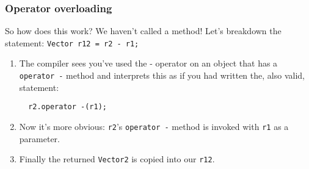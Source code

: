 \documentclass{beamer}
\begin{document}
\begin{frame}[fragile]
  \frametitle{Operator overloading}
  
  So how does this work?  We haven't called a method!  Let's breakdown the statement: \texttt{Vector r12 = r2 - r1;}\pause
  \begin{enumerate}
    \item{The compiler sees you've used the - operator on an object that has a \texttt{operator -} method and interprets this as if you had written the, also valid, statement:
    \begin{lstlisting}
  r2.operator -(r1);
    \end{lstlisting}}
    \pause
    \item{Now it's more obvious: \texttt{r2}'s \texttt{operator -} method is invoked with \texttt{r1} as a parameter.}
    \pause
    \item{Finally the returned \texttt{Vector2} is copied into our \texttt{r12}.}
  \end{enumerate}

\end{frame}
\end{document}
